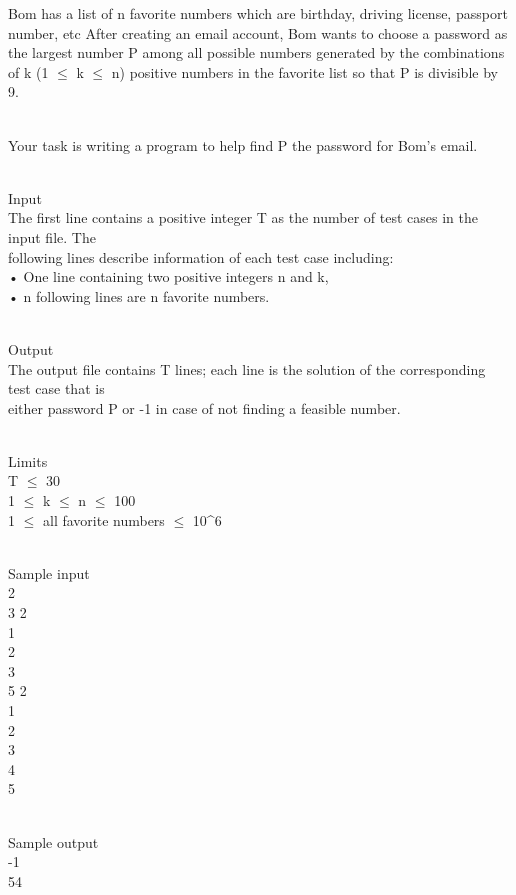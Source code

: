 



   Bom has a list of n favorite numbers which are birthday, driving license, passport number, etc After creating an email account, Bom wants to choose a password as the largest number P among all possible numbers generated by the combinations of k (1  $\le$  k  $\le$  n) positive numbers in the favorite list so that P is divisible by 9.  


\\   Your task is writing a program to help find P the password for Bom’s email.  


\\   Input   
\\   The first line contains a positive integer T as the number of test cases in the input file. The   
\\   following lines describe information of each test case including:   
\\   • One line containing two positive integers n and k,   
\\   • n following lines are n favorite numbers.  


\\   Output   
\\   The output file contains T lines; each line is the solution of the corresponding test case that is   
\\   either password P or -1 in case of not finding a feasible number.  


\\   Limits   
\\   T  $\le$  30   
\\   1  $\le$  k  $\le$  n  $\le$  100   
\\   1  $\le$  all favorite numbers  $\le$  10^6  


\\   Sample input   
\\   2   
\\   3 2   
\\   1   
\\   2   
\\   3   
\\   5 2   
\\   1   
\\   2   
\\   3   
\\   4   
\\   5  


\\   Sample output   
\\   -1   
\\   54  
